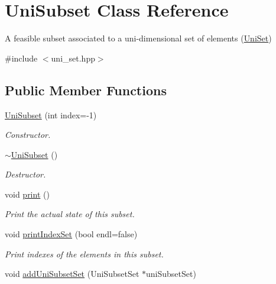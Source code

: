 \hypertarget{classUniSubset}{\section{Uni\-Subset Class Reference}
\label{classUniSubset}
}


A feasible subset associated to a uni-\/dimensional set of elements (\hyperlink{classUniSet}{Uni\-Set})  




{\ttfamily \#include $<$uni\-\_\-set.\-hpp$>$}

\subsection*{Public Member Functions}
\begin{DoxyCompactItemize}
\item 
\hyperlink{classUniSubset_a07ff3af1804ad82899583c0207b233dc}{Uni\-Subset} (int index=-\/1)
\begin{DoxyCompactList}\small\item\em Constructor. \end{DoxyCompactList}\item 
\hypertarget{classUniSubset_a84519a983473e56ad479d29baff45a34}{\hyperlink{classUniSubset_a84519a983473e56ad479d29baff45a34}{$\sim$\-Uni\-Subset} ()}\label{classUniSubset_a84519a983473e56ad479d29baff45a34}

\begin{DoxyCompactList}\small\item\em Destructor. \end{DoxyCompactList}\item 
\hypertarget{classUniSubset_a1be7871c599958a13258e51b01832c25}{void \hyperlink{classUniSubset_a1be7871c599958a13258e51b01832c25}{print} ()}\label{classUniSubset_a1be7871c599958a13258e51b01832c25}

\begin{DoxyCompactList}\small\item\em Print the actual state of this subset. \end{DoxyCompactList}\item 
\hypertarget{classUniSubset_aea0db49838de9813249152cd3128a47e}{void \hyperlink{classUniSubset_aea0db49838de9813249152cd3128a47e}{print\-Index\-Set} (bool endl=false)}\label{classUniSubset_aea0db49838de9813249152cd3128a47e}

\begin{DoxyCompactList}\small\item\em Print indexes of the elements in this subset. \end{DoxyCompactList}\item 
\hypertarget{classUniSubset_a7000de6419fa5cdd69b577dbdb6f4b59}{void \hyperlink{classUniSubset_a7000de6419fa5cdd69b577dbdb6f4b59}{add\-Uni\-Subset\-Set} (Uni\-Subset\-Set $\ast$uni\-Subset\-Set)}\label{classUniSubset_a7000de6419fa5cdd69b577dbdb6f4b59}


\end{DoxyCompactItemize}
